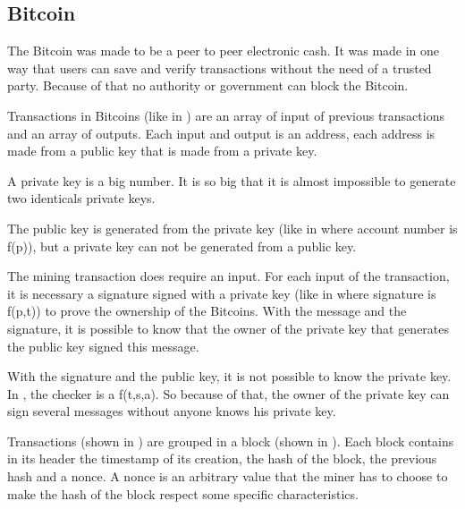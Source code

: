 \subsection{Bitcoin}

The Bitcoin was made to be a peer to peer electronic cash.
It was made in one way that users can save and verify transactions without the need of a trusted party.
Because of that no authority or government can block the Bitcoin.


Transactions in Bitcoins (like in ) are an array of input of
previous transactions and an array of outputs.
Each input and output is an address, each address is made from a public key
that is made from a private key.


A private key is a big number.
It is so big that it is almost impossible to generate two identicals private keys.

The public key is generated from the private key
(like in  where account number is f(p)),
but a private key can not be generated from a public key.

The mining transaction does require an input.
For each input of the transaction, it is necessary a signature signed with a private key
(like in  where signature is f(p,t))
to prove the ownership of the Bitcoins.
With the message and the signature, it is possible to know that the owner of the private key
that generates the public key signed this message.

With the signature and the public key, it is not possible to know the private key.
In , the checker is a f(t,s,a).
So because of that, the owner of the private key can sign several messages without anyone knows
his private key.


Transactions (shown in ) are grouped in a block (shown in ).
Each block contains in its header the timestamp of its creation, the hash of the block,
the previous hash and a nonce.
A nonce is an arbitrary value that the miner has to choose to make the hash of the block respect some
specific characteristics.

